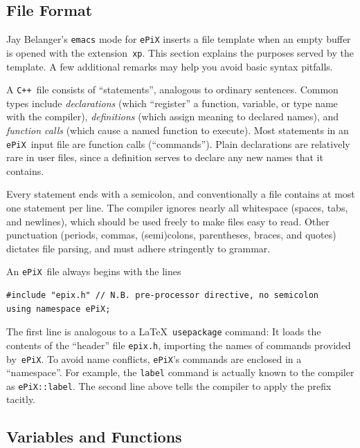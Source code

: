 \documentclass[12pt,letterpaper]{book}
\newcommand{\code}[1]{\texttt{#1}}
\newcommand{\filename}[1]{\texttt{#1}}
\newcommand{\ePiX}{\code{ePiX}}
\newcommand{\CXX}{\code{C++}}
\newcommand{\findex}[1]{\ignorespaces}
\begin{document}
\subsection{File Format}

\index{Emacs@\code{emacs}}
Jay Belanger's \code{emacs} mode for \code{ePiX} inserts a file
template when an empty buffer is opened with the extension~\code{xp}.
This section explains the purposes served by the template. A few
additional remarks may help you avoid basic syntax pitfalls.

A \CXX\ file consists of ``statements'', analogous to ordinary
sentences. Common types include \emph{declarations} (which
``register'' a function, variable, or type name with the compiler),
\emph{definitions} (which assign meaning to declared names), and
\emph{function calls} (which cause a named function to execute).  Most
statements in an \ePiX\ input file are function calls (``commands'').
Plain declarations are relatively rare in user files, since a
definition serves to declare any new names that it contains.

Every statement ends with a semicolon, and conventionally a file
contains at most one statement per line.  The compiler ignores
nearly all whitespace (spaces, tabs, and newlines), which should be
used freely to make files easy to read.  Other punctuation
(periods, commas, (semi)colons, parentheses, braces, and quotes)
dictates file parsing, and must adhere stringently to grammar.

An \ePiX\ file always begins with the lines
\findex{include}
\begin{verbatim}
#include "epix.h" // N.B. pre-processor directive, no semicolon
using namespace ePiX;
\end{verbatim}
The first line is analogous to a \LaTeX\ \code{usepackage} command: It
loads the contents of the ``header'' file \filename{epix.h}, importing
the names of commands provided by~\ePiX.  To avoid name conflicts,
\ePiX's commands are enclosed in a ``namespace''. For example, the
\code{label} command is actually known to the compiler as
\code{ePiX::label}. The second line above tells the compiler to apply
the prefix tacitly.


\subsection{Variables and Functions}
\end{document}
